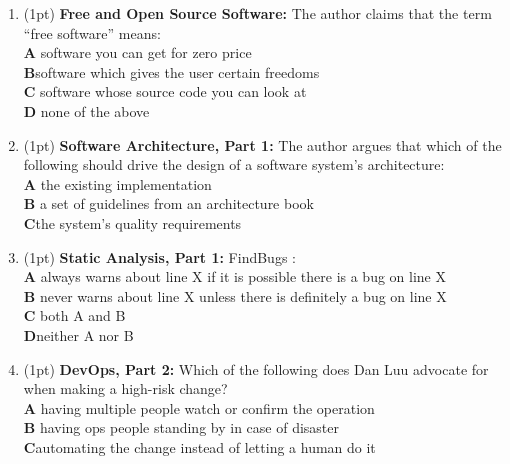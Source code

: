 \documentclass{report}
\newif\ifkey
\newcommand{\correct}[1]{\ifkey\color{red}\textbf{#1}\color{black}\else\textbf{#1}\fi\xspace}
\newcommand*{\pts}[1]{\addtocounter{points}{#1}(#1pt)}
\begin{document}
\begin{spacing}{1.4}
\begin{enumerate}[leftmargin=*]
\item \pts{1}
  \textbf{Free and Open Source Software:}
  The author claims that the term “free software” means:
  \\ \textbf{A}\hspace{0.2in} software you can get for zero price
  \\ \correct{B}\hspace{0.2in}software which gives the user certain freedoms
  \\ \textbf{C}\hspace{0.2in} software whose source code you can look at
  \\ \textbf{D}\hspace{0.2in} none of the above

\item \pts{1}
  \textbf{Software Architecture, Part 1:}
  The author argues that which of the following should drive the design of a software system’s architecture:
  \\ \textbf{A}\hspace{0.2in} the existing implementation
  \\ \textbf{B}\hspace{0.2in} a set of guidelines from an architecture book
  \\ \correct{C}\hspace{0.2in}the system’s quality requirements

\item \pts{1}
  \textbf{Static Analysis, Part 1:}
  FindBugs \underline{\hspace{1in}}:
  \\ \textbf{A}\hspace{0.2in} always warns about line X if it is possible there is a bug on line X
  \\ \textbf{B}\hspace{0.2in} never warns about line X unless there is definitely a bug on line X
  \\ \textbf{C}\hspace{0.2in} both A and B
  \\ \correct{D}\hspace{0.2in}neither A nor B

\item \pts{1}
  \textbf{DevOps, Part 2:}
  Which of the following does Dan Luu advocate for when making a high-risk change?
  \\ \textbf{A}\hspace{0.2in} having multiple people watch or confirm the operation
  \\ \textbf{B}\hspace{0.2in} having ops people standing by in case of disaster
  \\ \correct{C}\hspace{0.2in}automating the change instead of letting a human do it
 


\end{enumerate}
\end{spacing}
\end{document}
